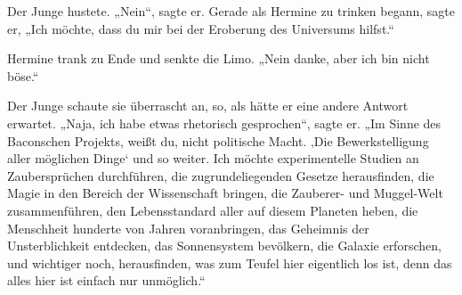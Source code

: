 Der Junge hustete. „Nein“, sagte er. Gerade als Hermine zu trinken begann, sagte er, „Ich möchte, dass du mir bei der Eroberung des Universums hilfst.“

Hermine trank zu Ende und senkte die Limo. „Nein danke, aber ich bin nicht böse.“

Der Junge schaute sie überrascht an, so, als hätte er eine andere Antwort erwartet. „Naja, ich habe etwas rhetorisch gesprochen“, sagte er. „Im Sinne des Baconschen Projekts, weißt du, nicht politische Macht. ‚Die Bewerkstelligung aller möglichen Dinge‘ und so weiter. Ich möchte experimentelle Studien an Zaubersprüchen durchführen, die zugrundeliegenden Gesetze herausfinden, die Magie in den Bereich der Wissenschaft bringen, die Zauberer- und Muggel-Welt zusammenführen, den Lebensstandard aller auf diesem Planeten heben, die Menschheit hunderte von Jahren voranbringen, das Geheimnis der Unsterblichkeit entdecken, das Sonnensystem bevölkern, die Galaxie erforschen, und wichtiger noch, herausfinden, was zum Teufel hier eigentlich los ist, denn das alles hier ist einfach nur unmöglich.“%

